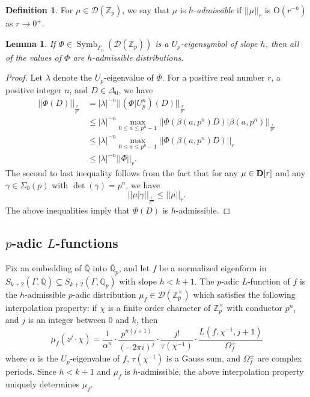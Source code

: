 \documentclass{amsart}
\theoremstyle{plain}
\newtheorem{lemma}[thm]{Lemma}
\theoremstyle{definition}
\newtheorem{defn}[thm]{Definition}
\newcommand{\D}{{\mathcal D}}
\newcommand{\bD}{{\bf D}}
\newcommand{\OO}{\text{O}}
\newcommand{\Z}{{\mathbb Z}}
\newcommand{\Q}{{\mathbb Q}}
\newcommand{\Qpbar}{\overline{{\Q}}_p}
\newcommand{\Qbar}{\overline{{\Q}}}
\newcommand{\Zp}{\Z_p}
\newcommand{\Zpx}{\Z_p^\times}
\newcommand{\sigop}{\Sigma_0(p)}
\newcommand{\bapn}{\beta(a,p^n)}
\newcommand{\Drigv}[1]{\bD[#1]}
\newcommand{\Dla}{\D(\Zp)}
\DeclareMathOperator{\Symb}{Symb}
\newcommand{\MSo}[1]{\Symb_{\Gamma_0}(#1)}
\begin{document}
\begin{defn}
For $\mu \in \Dla$, we say that $\mu$ is {\it $h$-admissible} if $|| \mu||_r$ is $\OO(r^{-h})$ as $r \to 0^+$.  
\end{defn}

\begin{lemma}
\label{lemma:admis} 
If $\Phi \in \MSo{\Dla}$ is a $U_p$-eigensymbol
of slope $h$, then all of the values of $\Phi$ are $h$-admissible distributions.
\end{lemma}

\begin{proof}
Let $\lambda$ denote the $U_p$-eigenvalue of $\Phi$.  For a positive real number $r$, a positive integer $n$, and $D \in \Delta_0$, we have
\begin{align*}
|| \Phi(D) ||_{\frac{r}{p^n}} &= |\lambda|^{-n} || (\Phi \big|
U_p^n)(D) ||_{\frac{r}{p^n}} \\
&\leq |\lambda|^{-n} \max_{0 \leq a \leq p^n-1} || \Phi(\bapn D) \big|
\bapn
||_{\frac{r}{p^n}} \\
&\leq |\lambda|^{-n} \max_{0 \leq a \leq p^n-1} ||
\Phi(\bapn D) ||_r \\
& \leq |\lambda|^{-n}||\Phi||_r.
\end{align*}
The second to last inequality follows from the fact that for any $\mu \in
\Drigv{r}$ and any $\gamma \in \sigop$ with $\det(\gamma)=p^n$, we
have 
$$
|| \mu \big| \gamma||_{\frac{r}{p^n}} \leq || \mu ||_r.
$$
The above inequalities imply that $\Phi(D)$ is $h$-admissible.
\end{proof}

\subsection{$p$-adic $L$-functions}
Fix an embedding of $\Qbar$ into $\Qpbar$, and let $f$ be a normalized eigenform in $S_{k+2}(\Gamma,\Qbar) \subseteq S_{k+2}(\Gamma,\Qpbar)$ with slope $h  < k+1$.  The $p$-adic $L$-function of $f$ is the $h$-admissible $p$-adic distribution $\mu_f \in \D(\Zpx)$ which satisfies the following interpolation property: if $\chi$ is a finite order character of $\Zp^\times$ with conductor $p^n$, and $j$ is an integer between $0$ and $k$,
then
\begin{equation}
\label{eqn:interpolate}
\mu_f(z^j \cdot \chi) = \frac{1}{\alpha^n} \cdot \frac{p^{n(j+1)}}{(-2\pi i) ^j} \cdot \frac{j!}{\tau(\chi^{-1})} \cdot \frac{L(f,\chi^{-1},j+1)}{\Omega_f^\pm}
\end{equation}
where $\alpha$ is the $U_p$-eigenvalue of $f$, $\tau(\chi^{-1})$ is a Gauss sum, and $\Omega_f^\pm$ are complex periods.  Since $h < k+1$ and $\mu_f$ is $h$-admissible, the above interpolation property uniquely determines $\mu_f$.
\end{document}

